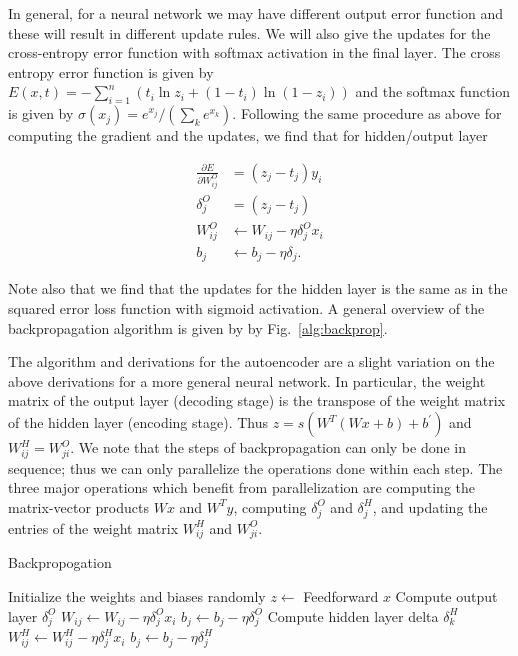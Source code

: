 \documentclass[conference]{IEEEtran}
\begin{document}
In general, for a neural network we may have different output error function and these will result in different update rules. We will also give the updates
for the cross-entropy error function with softmax activation in the final layer.
The cross entropy error function is given by $E(x,t) = -\sum_{i=1}^n \left(t_i\ln z_i + (1-t_i)\ln(1-z_i)\right)$
and the softmax function is given by $\sigma(x_j) = e^{x_j} /(\sum_k e^{x_k})$. Following the same procedure as above
for computing the gradient and the updates, we find that for hidden/output layer

\begin{equation}
\begin{split}
\frac{\partial E}{\partial W^O_{ij}} &= (z_j - t_j)y_i \\
\delta^O_j &= (z_j-t_j) \\
W^O_{ij} &\leftarrow W_{ij} - \eta \delta^O_j x_i \\
b_j &\leftarrow b_j - \eta\delta_j.
\end{split}
\end{equation}

Note also that we find that the updates for the hidden layer is the same as in the squared error loss function with sigmoid activation. A general overview of the backpropagation algorithm is given by by Fig.~\ref{alg:backprop}.

The algorithm and derivations for the autoencoder are a slight variation on the above derivations for a more general neural network. In particular, the weight matrix of the output layer (decoding stage) is the transpose of the weight matrix of the hidden layer (encoding stage). Thus $z=s(W^{T}(Wx + b) + b^{'})$ and $W^H_{ij} = W^O_{ji}$. We note that the steps of backpropagation can only be done in sequence; thus we can only parallelize the operations done within each step. The three major operations which benefit from parallelization are computing the matrix-vector products $Wx$ and $W^{T}y$, computing $\delta^O_j$ and $\delta^H_j$, and updating the entries of the weight matrix $W^H_{ij}$ and $W^O_{ji}$.

\begin{algorithm}[h]
\caption{Backpropogation}
\label{alg:backprop}
\begin{algorithmic}
\STATE Initialize the weights and biases randomly
		\STATE $z\gets$ Feedforward $x$
		\STATE Compute output layer $\delta_j^O$
		\STATE ${W_{ij} \leftarrow W_{ij} - \eta \delta^O_j x_i}$
		\STATE $b_j \leftarrow b_j - \eta\delta^O_j$
			\STATE Compute hidden layer delta $\delta_k^H$
			\STATE ${W^H_{ij} \leftarrow W^H_{ij} - \eta\delta^H_jx_i}$
			\STATE $b_j \leftarrow b_j - \eta\delta^H_j$
		\ENDFOR
	\ENDFOR
\ENDFOR
\end{algorithmic}
\end{algorithm}
\end{document}
